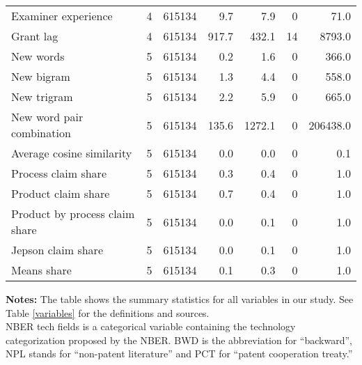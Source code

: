 \begin{table}
\begin{tabular}[t]{lrrrrrr}
Examiner experience & 4 & 615134 & 9.7 & 7.9 & 0 & 71.0\\
Grant lag & 4 & 615134 & 917.7 & 432.1 & 14 & 8793.0\\
\addlinespace
New words & 5 & 615134 & 0.2 & 1.6 & 0 & 366.0\\
New bigram & 5 & 615134 & 1.3 & 4.4 & 0 & 558.0\\
New trigram & 5 & 615134 & 2.2 & 5.9 & 0 & 665.0\\
New word pair combination & 5 & 615134 & 135.6 & 1272.1 & 0 & 206438.0\\
Average cosine similarity & 5 & 615134 & 0.0 & 0.0 & 0 & 0.1\\
Process claim share & 5 & 615134 & 0.3 & 0.4 & 0 & 1.0\\
Product claim share & 5 & 615134 & 0.7 & 0.4 & 0 & 1.0\\
Product by process claim share & 5 & 615134 & 0.0 & 0.1 & 0 & 1.0\\
Jepson claim share & 5 & 615134 & 0.0 & 0.1 & 0 & 1.0\\
Means share & 5 & 615134 & 0.1 & 0.3 & 0 & 1.0\\
\bottomrule
\end{tabular}
\vspace{0.5em}
\begin{minipage}{0.97\textwidth}\footnotesize
	\textbf{Notes:} The table shows the summary statistics for all variables in our study. See Table  \ref{variables} for the definitions and sources. \\
	NBER tech fields is a categorical variable containing the technology categorization proposed by the NBER. BWD is the abbreviation for ``backward'', NPL stands for ``non-patent literature'' and PCT for ``patent cooperation treaty.'' 
\end{minipage}
\end{table}
